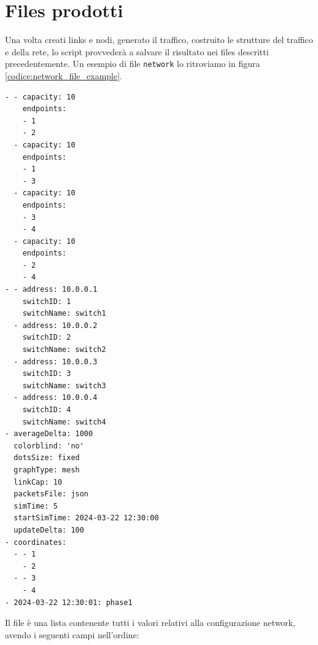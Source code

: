 \documentclass[binding=0.6cm]{sapthesis}
\begin{document}
\section{Files prodotti}
\label{sec:files_prodotti}
Una volta creati links e nodi, generato il traffico, costruito le strutture del traffico e della rete, lo script provvederà a salvare il risultato nei files descritti precedentemente.
Un esempio di file \texttt{network} lo ritroviamo in figura \ref*{codice:network_file_example}.
{\scriptsize %
\begin{lstlisting}[caption={Esempio di network file}, label={codice:network_file_example}]
- - capacity: 10
    endpoints:
    - 1
    - 2
  - capacity: 10
    endpoints:
    - 1
    - 3
  - capacity: 10
    endpoints:
    - 3
    - 4
  - capacity: 10
    endpoints:
    - 2
    - 4
- - address: 10.0.0.1
    switchID: 1
    switchName: switch1
  - address: 10.0.0.2
    switchID: 2
    switchName: switch2
  - address: 10.0.0.3
    switchID: 3
    switchName: switch3
  - address: 10.0.0.4
    switchID: 4
    switchName: switch4
- averageDelta: 1000
  colorblind: 'no'
  dotsSize: fixed
  graphType: mesh
  linkCap: 10
  packetsFile: json
  simTime: 5
  startSimTime: 2024-03-22 12:30:00
  updateDelta: 100
- coordinates:
  - - 1
    - 2
  - - 3
    - 4
- 2024-03-22 12:30:01: phase1

\end{lstlisting}
}
Il file è una lista contenente tutti i valori relativi alla configurazione network, avendo i seguenti campi nell'ordine:
\end{document}
